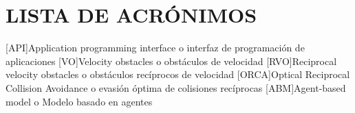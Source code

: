 
\chapter*{LISTA DE ACR\'ONIMOS}
\begin{acronym}
[API]{Application programming interface o interfaz de programación de aplicaciones}
[VO]{Velocity obstacles o obstáculos de velocidad}
[RVO]{Reciprocal velocity obstacles o obstáculos recíprocos de velocidad}
[ORCA]{Optical Reciprocal Collision Avoidance o evasión óptima de colisiones recíprocas}
[ABM]{Agent-based model o Modelo basado en agentes}
\end{acronym}
\clearpage